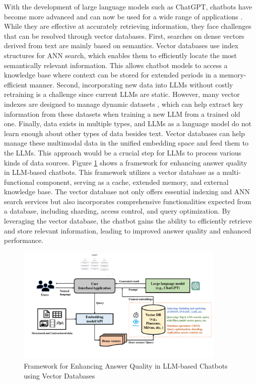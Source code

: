 \documentclass[11pt]{article}
\begin{document}
With the development of large language models such as ChatGPT, chatbots have become more advanced and can now be used for a wide range of applications \cite{DBLP:journals/corr/abs-2303-08774,DBLP:conf/iclr/PatelLRCRC23,DBLP:conf/nips/BrownMRSKDNSSAA20}. While they are effective at accurately retrieving information, they face challenges that can be resolved through vector databases. First, searches on dense vectors derived from text are mainly based on semantics. Vector databases use index structures for ANN search, which enables them to efficiently locate the most semantically relevant information. This allows chatbot models to access a knowledge base where context can be stored for extended periods in a memory-efficient manner. Second, incorporating new data into LLMs without costly retraining is a challenge since current LLMs are static. However, many vector indexes are designed to manage dynamic datasets \cite{DBLP:journals/corr/abs-2105-09613}, which can help extract key information from these datasets when training a new LLM from a trained old one. Finally, data exists in multiple types, and LLMs as a language model do not learn enough about other types of data besides text. Vector databases can help manage these multimodal data in the unified embedding space and feed them to the LLMs. This approach would be a crucial step for LLMs to process various kinds of data sources. Figure \ref{bolong_fig:vdb} shows a framework for enhancing answer quality in LLM-based chatbots. This framework utilizes a vector database as a multi-functional component, serving as a cache, extended memory, and external knowledge base. The vector database not only offers essential indexing and ANN search services but also incorporates comprehensive functionalities expected from a database, including sharding, access control, and query optimization. By leveraging the vector database, the chatbot gains the ability to efficiently retrieve and store relevant information, leading to improved answer quality and enhanced performance.

\begin{figure}
    \centering
    \includegraphics[width=0.9\textwidth]{submissions/Bolong2023/figs/invite_paper_pics_2.pdf}
    \caption{Framework for Enhancing Answer Quality in LLM-based Chatbots using Vector Databases}
    \label{bolong_fig:vdb}
\end{figure}
\end{document}
